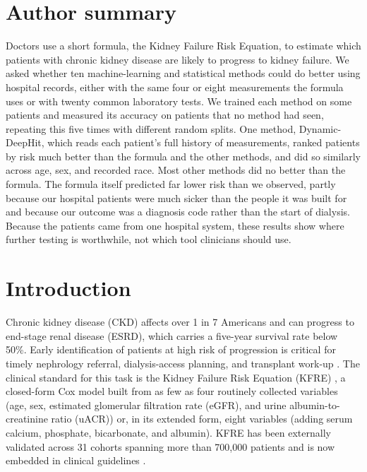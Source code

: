 \documentclass[10pt,letterpaper]{article}
\begin{document}
\section*{Author summary}
Doctors use a short formula, the Kidney Failure Risk Equation, to estimate which patients with chronic kidney disease are likely to progress to kidney failure. We asked whether ten machine-learning and statistical methods could do better using hospital records, either with the same four or eight measurements the formula uses or with twenty common laboratory tests. We trained each method on some patients and measured its accuracy on patients that no method had seen, repeating this five times with different random splits. One method, Dynamic-DeepHit, which reads each patient's full history of measurements, ranked patients by risk much better than the formula and the other methods, and did so similarly across age, sex, and recorded race. Most other methods did no better than the formula. The formula itself predicted far lower risk than we observed, partly because our hospital patients were much sicker than the people it was built for and because our outcome was a diagnosis code rather than the start of dialysis. Because the patients came from one hospital system, these results show where further testing is worthwhile, not which tool clinicians should use.

\clearpage
{}
\linenumbers

\section*{Introduction}\label{Intro}

Chronic kidney disease (CKD) affects over 1 in 7 Americans \cite{CDC2023CKD} and can progress to end-stage renal disease (ESRD), which carries a five-year survival rate below 50\%. Early identification of patients at high risk of progression is critical for timely nephrology referral, dialysis-access planning, and transplant work-up \cite{levin2011early_detection}. The clinical standard for this task is the Kidney Failure Risk Equation (KFRE) \cite{tangri2011predicting}, a closed-form Cox model built from as few as four routinely collected variables (age, sex, estimated glomerular filtration rate (eGFR), and urine albumin-to-creatinine ratio (uACR)) or, in its extended form, eight variables (adding serum calcium, phosphate, bicarbonate, and albumin). KFRE has been externally validated across 31 cohorts spanning more than 700,000 patients \cite{tangri2016multinational} and is now embedded in clinical guidelines \cite{major2019kfre_external_validation}.
\end{document}
